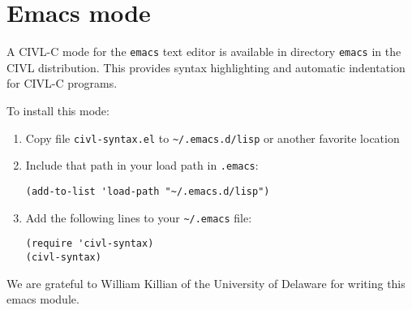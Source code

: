 \chapter{Emacs mode}

A CIVL-C mode for the \texttt{emacs} text editor is available in
directory \texttt{emacs} in the CIVL distribution.  This provides
syntax highlighting and automatic indentation for CIVL-C programs.

To install this mode:
\begin{enumerate}
\item Copy file \texttt{civl-syntax.el} to \verb!~/.emacs.d/lisp! or another favorite location
\item Include that path in your load path in \verb!.emacs!:
\begin{verbatim}
(add-to-list 'load-path "~/.emacs.d/lisp")
\end{verbatim}
\item Add the following lines to your \verb!~/.emacs! file:
\begin{verbatim}
(require 'civl-syntax)
(civl-syntax)
\end{verbatim}
\end{enumerate}

We are grateful to William Killian of the University of Delaware for
writing this emacs module.
